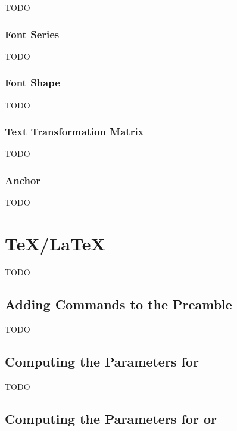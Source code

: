
TODO


\subsection{Font Series}\label{sec:fontseries}


TODO


\subsection{Font Shape}\label{sec:fontshape}


TODO


\subsection{Text Transformation Matrix}\label{sec:textmatrix}


TODO


\subsection{Anchor}\label{sec:fontanchor}


TODO


\chapter{\TeX/\LaTeX}\label{sec:tex}

TODO


\section{Adding Commands to the Preamble}\label{sec:preamble}

TODO


\section{Computing the Parameters for }\label{sec:parshape}

TODO


\section{Computing the Parameters for  or
}
\label{sec:shapepar}

